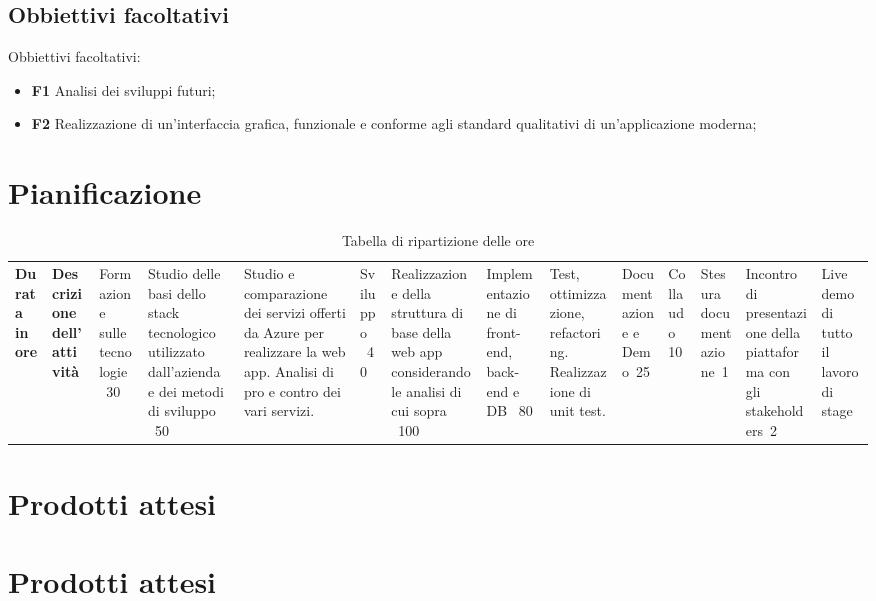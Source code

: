 \subsection{Obbiettivi facoltativi}
Obbiettivi facoltativi:
\begin{itemize}
    \item \textbf{F1} Analisi dei sviluppi futuri;
    \item \textbf{F2} Realizzazione di un'interfaccia grafica, funzionale e conforme agli standard qualitativi di un'applicazione moderna;

\end{itemize}

\section{Pianificazione}
\label{sec:pianificazione}
\begin{table}%
    \caption{Tabella di ripartizione delle ore}
    \label{tab:ripartizione-ore}
    \begin{tabularx}{\textwidth}{lXl}
    \hline
    \textbf{Durata in ore} & \textbf{Descrizione dell'attività}\
     & Formazione sulle tecnologie \
    30 & Studio delle basi dello stack tecnologico utilizzato dall'azienda e dei metodi di sviluppo \
    50 & Studio e comparazione dei servizi offerti da Azure per realizzare la web app. Analisi di pro e contro dei vari servizi. \
    \hline
    180 & Sviluppo \
    40 & Realizzazione della struttura di base della web app considerando le analisi di cui sopra \
    100 & Implementazione di front-end, back-end e DB \
    80 & Test, ottimizzazione, refactoring. Realizzazione di unit test. \
    \hline
    40 & Documentazione e Demo\
    25 & Collaudo\
    10 & Stesura documentazione\
    1 & Incontro di presentazione della piattaforma con gli stakeholders\
    2 & Live demo di tutto il lavoro di stage\
    \hline
    \end{tabularx}
    \end{table}

\section{Prodotti attesi}
\section*{Prodotti attesi}
\label{sec:prodotti-attesi}

